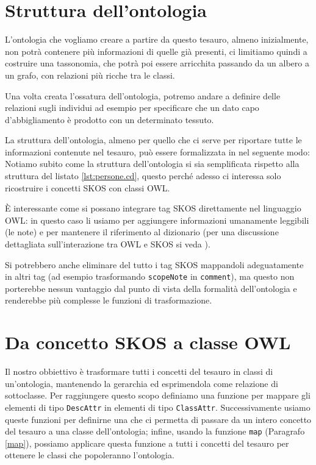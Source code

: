 \section{Struttura dell'ontologia}
L'ontologia che vogliamo creare a partire da questo tesauro, almeno inizialmente, non potrà contenere più informazioni di quelle già presenti, ci limitiamo quindi a costruire una tassonomia, che potrà poi essere arricchita passando da un albero a un grafo, con relazioni più ricche tra le classi. 

Una volta creata l'ossatura dell'ontologia, potremo andare a definire delle relazioni sugli individui ad esempio per specificare che un dato capo d'abbigliamento è prodotto con un determinato tessuto.

La struttura dell'ontologia, almeno per quello che ci serve per riportare tutte le informazioni contenute nel tesauro, può essere formalizzata in \cduce nel seguente modo:
Notiamo subito come la struttura dell'ontologia si sia semplificata rispetto alla struttura del listato \ref{lst:persone.cd}, questo perché adesso ci interessa solo ricostruire i concetti SKOS con classi OWL.

È interessante come si possano integrare tag SKOS direttamente nel linguaggio OWL: in questo caso li usiamo per aggiungere informazioni umanamente leggibili (le note) e per mantenere il riferimento al dizionario (per una discussione dettagliata sull'interazione tra OWL e SKOS si veda \cite{OWL&SKOS}).

Si potrebbero anche eliminare del tutto i tag SKOS mappandoli adeguatamente in altri tag (ad esempio trasformando \verb|scopeNote| in \verb|comment|), ma questo non porterebbe nessun vantaggio dal punto di vista della formalità dell'ontologia e renderebbe più complesse le funzioni di trasformazione.

\section{Da concetto SKOS a classe OWL}
Il nostro obbiettivo è trasformare tutti i concetti del tesauro in classi di un'ontologia, mantenendo la gerarchia ed esprimendola come relazione di sottoclasse. Per raggiungere questo scopo definiamo una funzione per mappare gli elementi di tipo \verb|DescAttr| in elementi di tipo \verb|ClassAttr|. Successivamente usiamo queste funzioni per definirne una che ci permetta di passare da un intero concetto del tesauro a una classe dell'ontologia; infine, usando la funzione \verb|map| (Paragrafo \ref{map}), possiamo applicare questa funzione a tutti i concetti del tesauro per ottenere le classi che popoleranno l'ontologia.
